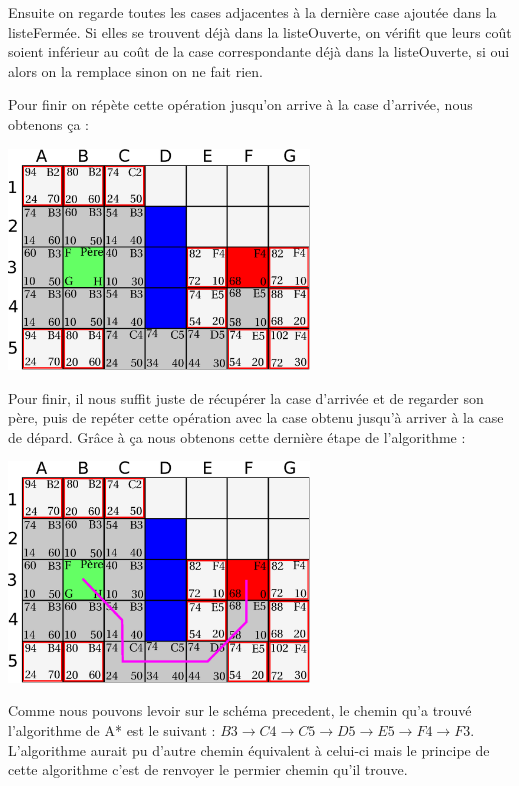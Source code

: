 			Ensuite on regarde toutes les cases adjacentes à la dernière case ajoutée dans la listeFermée. Si elles se trouvent déjà dans la listeOuverte, on vérifit que leurs coût soient inférieur au coût de la case correspondante déjà dans la listeOuverte, si oui alors on la remplace sinon on ne fait rien.
		
			Pour finir on répète cette opération jusqu'on arrive à la case d'arrivée, nous obtenons ça :
			\begin{center}
				\includegraphics[width=8cm]{./Analyse/Img/Grille5.eps}
			\end{center}
		
			Pour finir, il nous suffit juste de récupérer la case d'arrivée et de regarder son père, puis de repéter cette opération avec la case obtenu jusqu'à arriver à la case de dépard. Grâce à ça nous obtenons cette dernière étape de l'algorithme :
			\begin{center}
				\includegraphics[width=8cm]{./Analyse/Img/Grille6.eps}
			\end{center}
		
			Comme nous pouvons levoir sur le schéma precedent, le chemin qu'a trouvé l'algorithme de A* est le suivant : $ B3 \rightarrow C4 \rightarrow C5 \rightarrow D5 \rightarrow E5 \rightarrow F4 \rightarrow F3 $. L'algorithme aurait pu d'autre chemin équivalent à celui-ci mais le principe de cette algorithme c'est de renvoyer le permier chemin qu'il trouve.
		
